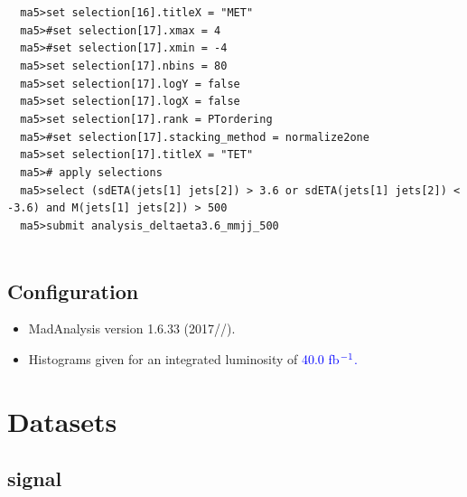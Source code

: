 \documentclass[a4paper, 10pt]{article}
\begin{document}
\texttt{ }\texttt{ }\texttt{ma5>set selection[16].titleX = "MET"\\
}
\texttt{ }\texttt{ }\texttt{ma5>\#set selection[17].xmax = 4\\
}
\texttt{ }\texttt{ }\texttt{ma5>\#set selection[17].xmin = -4\\
}
\texttt{ }\texttt{ }\texttt{ma5>set selection[17].nbins = 80\\
}
\texttt{ }\texttt{ }\texttt{ma5>set selection[17].logY = false\\
}
\texttt{ }\texttt{ }\texttt{ma5>set selection[17].logX = false\\
}
\texttt{ }\texttt{ }\texttt{ma5>set selection[17].rank = PTordering\\
}
\texttt{ }\texttt{ }\texttt{ma5>\#set selection[17].stacking\_method = normalize2one\\
}
\texttt{ }\texttt{ }\texttt{ma5>set selection[17].titleX = "TET"\\
}
\texttt{ }\texttt{ }\texttt{ma5>\# apply selections\\
}
\texttt{ }\texttt{ }\texttt{ma5>select (sdETA(jets[1] jets[2]) > 3.6 or sdETA(jets[1] jets[2]) < -3.6) and M(jets[1] jets[2]) > 500\\
}
\texttt{ }\texttt{ }\texttt{ma5>submit analysis\_deltaeta3.6\_mmjj\_500\\
}
\texttt{ }\texttt{ }\subsection{ Configuration}

\begin{itemize}
  \item MadAnalysis version 1.6.33 (2017//).
   \item Histograms given for an integrated luminosity of \textcolor{blue}{40.0}\textcolor{blue}{ fb}$^{\textcolor{blue}{-1}}$\textcolor{blue}{.}
\textcolor{blue}{}
\end{itemize}
\newpage
\section{ Datasets}

\subsection{ signal}
\end{document}
